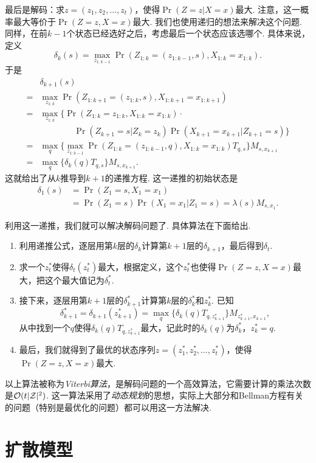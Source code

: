 最后是解码：求$z=(z_1,z_2,\dots,z_t)$，使得$\Pr(Z=z|X=x)$最大. 注意，这一概率最大等价于$\Pr(Z=z,X=x)$最大. 我们也使用递归的想法来解决这个问题. 同样，在前$k-1$个状态已经选好之后，考虑最后一个状态应该选哪个. 具体来说，定义
    \[\delta_k(s) = \max_{z_{1:k-1}}\Pr(Z_{1:k} = (z_{1:k-1}, s), X_{1:k}=x_{1:k}).\]
于是
\begin{align*}
    &\delta_{k+1}(s) \\
    =& \max_{z_{1:k}}\Pr(Z_{1:k+1} = (z_{1:k}, s), X_{1:k+1}=x_{1:k+1})\\
    =& \max_{z_{1:k}}\{\Pr(Z_{1:k} = z_{1:k}, X_{1:k}=x_{1:k})\cdot\\
    &\qquad\qquad\Pr(Z_{k+1}=s|Z_k=z_k) \Pr(X_{k+1}=x_{k+1}|Z_{k+1}=s)\}\\
    =& \max_{q}\{\max_{z_{1:k-1}}\Pr(Z_{1:k} = (z_{1:k-1},q), X_{1:k}=x_{1:k})T_{q,s}\}M_{s,x_{k+1}}\\
    =& \max_{q}\{\delta_k(q)T_{q,s}\}M_{s,x_{k+1}}.
\end{align*}
这就给出了从$k$推导到$k+1$的递推方程. 这一递推的初始状态是
\begin{align*}
    \delta_1(s) &= \Pr(Z_1=s, X_1=x_1)\\
     &= \Pr(Z_1=s)\Pr(X_1=x_1|Z_1=s) = \lambda(s)M_{s,x_1}.
\end{align*}

利用这一递推，我们就可以解决解码问题了. 具体算法在下面给出.
\begin{enumerate}
    \item 利用递推公式，逐层用第$k$层的$\delta_k$计算第$k+1$层的$\delta_{k+1}$，最后得到$\delta_t$. 
    \item 求一个$z_t^*$使得$\delta_t(z_t^*)$最大，根据定义，这个$z_t^*$也使得$\Pr(Z=z,X=x)$最大，把这个最大值记为$\delta^*_t$.
    \item 接下来，逐层用第$k+1$层的$\delta_{k+1}^*$计算第$k$层的$\delta_k^*$和$z_k^*$. 已知
    \[\delta_{k+1}^*=\delta_{k+1}(z_{k+1}^*)=\max_{q}\{\delta_k(q)T_{q,z_{k+1}^*}\}M_{z_{k+1}^*,x_{k+1}},\]
    从中找到一个$q$使得$\delta_k(q)T_{q,z_{k+1}^*}$最大，记此时的$\delta_k(q)$为$\delta_k^*$，$z_k^*=q$.
    \item 最后，我们就得到了最优的状态序列$z=(z_1^*,z_2^*,\dots,z_t^*)$，使得$\Pr(Z=z,X=x)$最大.
\end{enumerate}
以上算法被称为\textit{Viterbi算法}，是解码问题的一个高效算法，它需要计算的乘法次数是$\mathcal{O}(t|\mathcal Z|^2)$. 这一算法采用了\textit{动态规划}的思想，实际上大部分和Bellman方程有关的问题（特别是最优化的问题）都可以用这一方法解决.

\section{扩散模型}

